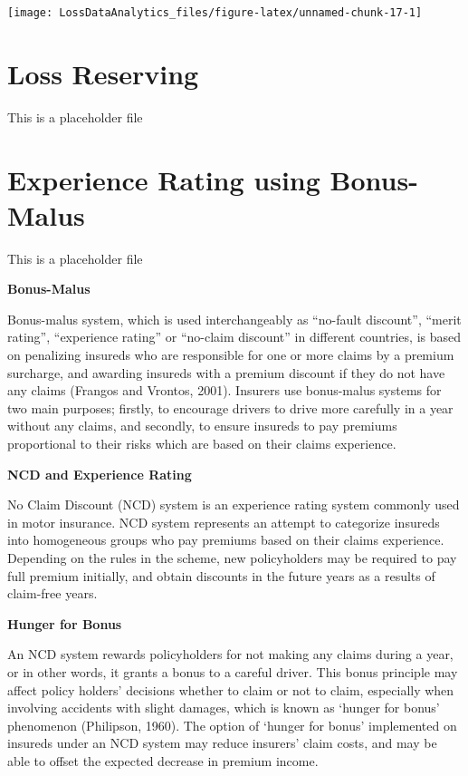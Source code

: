 \documentclass[]{book}
\theoremstyle{definition}
\theoremstyle{definition}
\theoremstyle{definition}
\theoremstyle{remark}
\begin{document}
\begin{center}\texttt{[image: LossDataAnalytics\_files/figure-latex/unnamed-chunk-17-1]} \end{center}

\chapter{Loss Reserving}\label{C:LossReserves}

This is a placeholder file

\chapter{Experience Rating using Bonus-Malus}\label{C:BonusMalus}

This is a placeholder file

\textbf{Bonus-Malus}

Bonus-malus system, which is used interchangeably as ``no-fault
discount'', ``merit rating'', ``experience rating'' or ``no-claim
discount'' in different countries, is based on penalizing insureds who
are responsible for one or more claims by a premium surcharge, and
awarding insureds with a premium discount if they do not have any claims
(Frangos and Vrontos, 2001). Insurers use bonus-malus systems for two
main purposes; firstly, to encourage drivers to drive more carefully in
a year without any claims, and secondly, to ensure insureds to pay
premiums proportional to their risks which are based on their claims
experience.

\textbf{NCD and Experience Rating}

No Claim Discount (NCD) system is an experience rating system commonly
used in motor insurance. NCD system represents an attempt to categorize
insureds into homogeneous groups who pay premiums based on their claims
experience. Depending on the rules in the scheme, new policyholders may
be required to pay full premium initially, and obtain discounts in the
future years as a results of claim-free years.

\textbf{Hunger for Bonus }

An NCD system rewards policyholders for not making any claims during a
year, or in other words, it grants a bonus to a careful driver. This
bonus principle may affect policy holders' decisions whether to claim or
not to claim, especially when involving accidents with slight damages,
which is known as `hunger for bonus' phenomenon (Philipson, 1960). The
option of `hunger for bonus' implemented on insureds under an NCD system
may reduce insurers' claim costs, and may be able to offset the expected
decrease in premium income.
\end{document}
